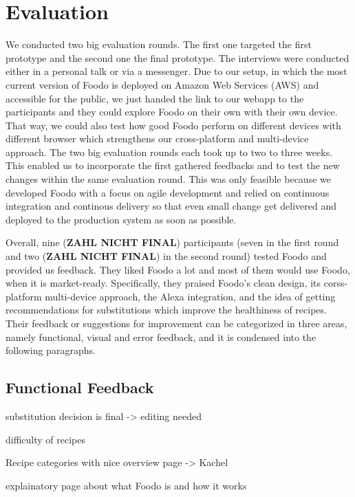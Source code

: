 \chapter{Evaluation}
We conducted two big evaluation rounds. The first one targeted the first prototype and the second one the final prototype. The interviews were conducted either in a personal talk or via a messenger. Due to our setup, in which the most current version of Foodo is deployed on Amazon Web Services (AWS) and accessible for the public, we just handed the link to our webapp to the participants and they could explore Foodo on their own with their own device. That way, we could also test how good Foodo perform on different devices with different browser which strengthens our cross-platform and multi-device approach. The two big evaluation rounds each took up to two to three weeks. This enabled us to incorporate the first gathered feedbacks and to test the new changes within the same evaluation round. This was only feasible because we developed Foodo with a focus on agile development and relied on continuous integration and continous delivery so that even small change get delivered and deployed to the production system as soon as possible. 

Overall, nine (\textbf{ZAHL NICHT FINAL}) participants (seven in the first round and two (\textbf{ZAHL NICHT FINAL}) in the second round) tested Foodo and provided us feedback. They liked Foodo a lot and most of them would use Foodo, when it is market-ready. Specifically, they praised Foodo's clean design, its corss-platform multi-device approach, the Alexa integration, and the idea of getting recommendations for substitutions which improve the healthiness of recipes. Their feedback or suggestions for improvement can be categorized in three areas, namely functional, visual and error feedback, and it is condensed into the following paragraphs.

\section{Functional Feedback}


substitution decision is final -> editing needed

difficulty of recipes

Recipe categories with nice overview page -> Kachel

explainatory page about what Foodo is and how it works

